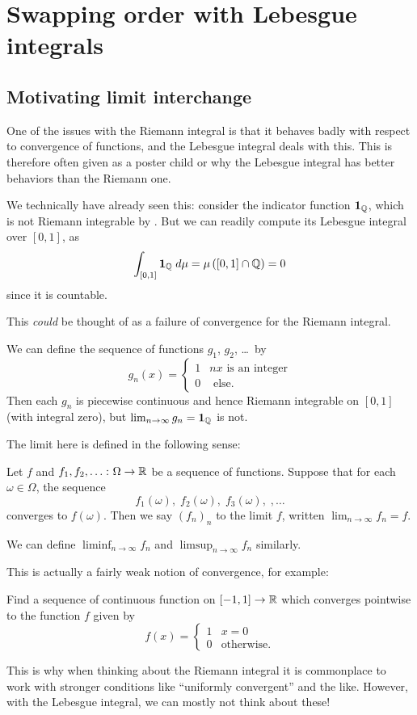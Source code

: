 \chapter{Swapping order with Lebesgue integrals}
\section{Motivating limit interchange}

One of the issues with the Riemann integral is
that it behaves badly with respect to convergence of functions,
and the Lebesgue integral deals with this.
This is therefore often given as a poster child
or why the Lebesgue integral has better behaviors than the Riemann one.

We technically have already seen this:
consider the indicator function $\mathbf{1}_\mathbb Q$,
which is not Riemann integrable by .
But we can readily compute its Lebesgue integral over $[0,1]$, as
\[ \int_{[0,1]} \mathbf{1}_\mathbb Q \; d\mu
	= \mu\left( [0,1] \cap \mathbb Q \right) = 0 \]
since it is countable.

This \emph{could} be thought of as a failure of convergence
for the Riemann integral.
\begin{example}
	\label{ex:1QQindicator}
	We can define the sequence of functions $g_1$, $g_2$, \dots\ by
	\[ g_n(x) = \begin{cases}
			1 & nx \text{ is an integer} \\
			0 & \text{ else}.
		\end{cases} \]
	Then each $g_n$ is piecewise continuous
	and hence Riemann integrable on $[0,1]$ (with integral zero),
	but $\lim_{n \to \infty} g_n = \mathbf{1}_\mathbb Q$ is not.
\end{example}

The limit here is defined in the following sense:
\begin{definition}
	Let $f$ and $f_1, f_2, \dots \colon \Omega \to \mathbb R$ be a sequence of functions.
	Suppose that for each $\omega \in \Omega$, the sequence
	\[ f_1(\omega), \; f_2(\omega), \; f_3(\omega), \;, \dots \]
	converges to $f(\omega)$.
	Then we say $(f_n)_n$ 
	to the limit $f$, written $\lim_{n \to \infty} f_n = f$.

	We can define $\liminf_{n \to \infty} f_n$
	and $\limsup_{n \to \infty} f_n$ similarly.
\end{definition}
This is actually a fairly weak notion of convergence, for example:
\begin{exercise}
	Find a sequence of continuous function on $[-1,1] \to \mathbb R$
	which converges pointwise to the function $f$ given by
	\[ f(x) = \begin{cases}
			1 & x = 0 \\
			0 & \text{otherwise}.
		\end{cases} \]
\end{exercise}
This is why when thinking about the Riemann integral
it is commonplace to work with stronger conditions like
``uniformly convergent'' and the like.
However, with the Lebesgue integral, we can mostly not think about these!

